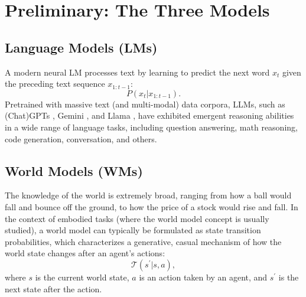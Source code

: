 \documentclass{article}
\begin{document}
\section{Preliminary: The Three Models}\label{sec:pre}

\subsection{Language Models (LMs)}\label{sec:pre:lm}

A modern neural LM processes text by learning to predict the next word $x_t$ given the preceding text sequence $x_{1:t-1}$:
\begin{equation}
    P(x_t | x_{1:t-1}).
\end{equation}
Pretrained with massive text (and multi-modal) data corpora, LLMs, such as (Chat)GPTs \citep{brown2020language,openai2023gpt4}, Gemini \citep{Gemini2023}, and Llama \citep{touvron2023llama,touvron2023llama2}, have exhibited emergent reasoning abilities in a wide range of language tasks, including question answering, math reasoning, code generation, conversation, and others.


\subsection{World Models (WMs)}\label{sec:pre:wm}


The knowledge of the world is extremely broad, ranging from how a ball would fall and bounce off the ground, to how the price of a stock would rise and fall. In the context of embodied tasks (where the world model concept is usually studied), a world model can typically be  formulated as state transition probabilities, which characterizes a generative, casual mechanism of how the world state changes after an agent's actions:
\begin{equation}
    \mathcal{T}(s^\prime | s, a),
    \label{eq:world_model}
\end{equation}
where $s$ is the current world state, $a$ is an action taken by an agent, and $s^\prime$ is the next state after the action. %
\end{document}
